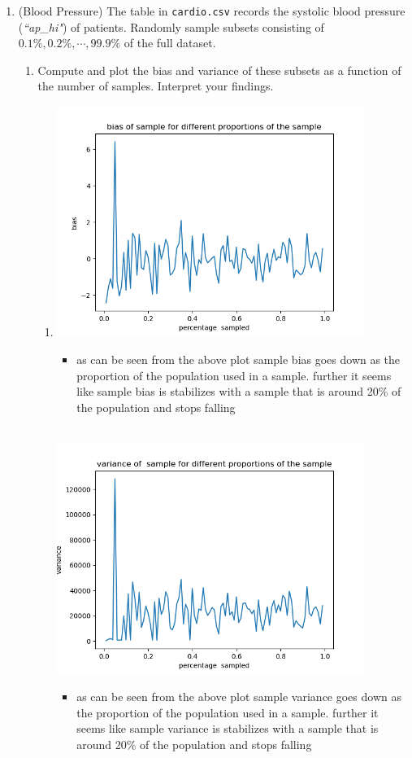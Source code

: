 \documentclass[12pt,twoside]{article}
\begin{document}
\begin{enumerate}
\begin{enumerate}
\newpage
\end{enumerate}
\item (Blood Pressure) The table in \texttt{cardio.csv} records the systolic blood pressure (\textit{``ap\_hi"}) of patients. Randomly sample subsets consisting of $0.1\%, 0.2\%, \cdots, 99.9\%$ of the full dataset. 
\begin{enumerate}
\item Compute and plot the bias and variance of these subsets as a function of the number of samples. Interpret your findings.
\begin{enumerate} 
    \item \includegraphics[width=10cm]{homework/homework_3/immages/Figure_1.png}
    \begin{itemize}
        \item as can be seen from the above plot sample bias goes down as the proportion of the population used in a sample. further it seems like sample bias is stabilizes with a sample that is around 20$\%$ of the population and stops falling
    \end{itemize} 
    \\ \includegraphics[width=10cm]{homework/homework_3/immages/Figure_2.png}
        \begin{itemize}
                \item as can be seen from the above plot sample variance goes down as the proportion of the population used in a sample. further it seems like sample variance is stabilizes with a sample that is around 20$\%$ of the population and stops falling
    \end{itemize}
\end{enumerate}



\end{enumerate}
\end{enumerate}
\end{document}
